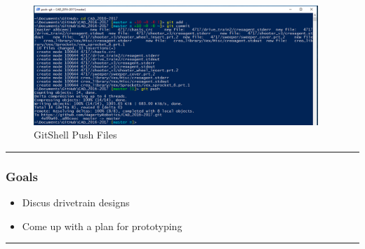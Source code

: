 \begin{figure}
\centering
\includegraphics[width=0.955\textwidth, angle=0]{Meetings/September/09-23-21/gitshellpush.png}
\caption{GitShell Push Files}
\label{fig:092322_4}
\end{figure}


\noindent\hfil\rule{\textwidth}{.4pt}\hfil
\subsubsection*{Goals}
\begin{itemize}
    \item Discus drivetrain designs
    \item Come up with a plan for prototyping
\end{itemize} 

\noindent\hfil\rule{\textwidth}{.4pt}\hfil

